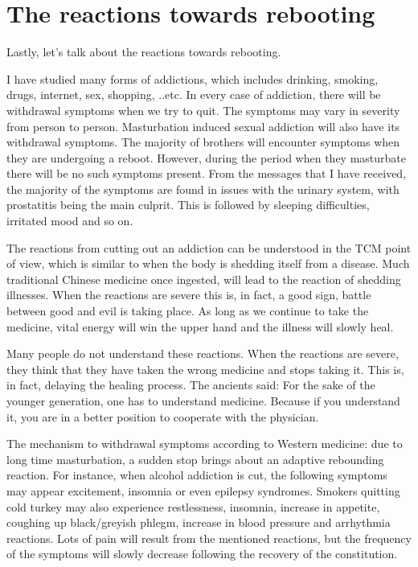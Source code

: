\documentclass[
]{book}
\begin{document}
\hypertarget{the-reactions-towards-rebooting}{%
\section{The reactions towards rebooting}\label{the-reactions-towards-rebooting}}

Lastly, let's talk about the reactions towards rebooting.

I have studied many forms of addictions, which includes drinking, smoking, drugs, internet, sex, shopping, ..etc. In every case of addiction, there will be withdrawal symptoms when we try to quit. The symptoms may vary in severity from person to person. Masturbation induced sexual addiction will also have its withdrawal symptoms. The majority of brothers will encounter symptoms when they are undergoing a reboot. However, during the period when they masturbate there will be no such symptoms present. From the messages that I have received, the majority of the symptoms are found in issues with the urinary system, with prostatitis being the main culprit. This is followed by sleeping difficulties, irritated mood and so on.

The reactions from cutting out an addiction can be understood in the TCM point of view, which is similar to when the body is shedding itself from a disease. Much traditional Chinese medicine once ingested, will lead to the reaction of shedding illnesses. When the reactions are severe this is, in fact, a good sign, battle between good and evil is taking place. As long as we continue to take the medicine, vital energy will win the upper hand and the illness will slowly heal.

Many people do not understand these reactions. When the reactions are severe, they think that they have taken the wrong medicine and stops taking it. This is, in fact, delaying the healing process. The ancients said: For the sake of the younger generation, one has to understand medicine. Because if you understand it, you are in a better position to cooperate with the physician.

The mechanism to withdrawal symptoms according to Western medicine: due to long time masturbation, a sudden stop brings about an adaptive rebounding reaction. For instance, when alcohol addiction is cut, the following symptoms may appear excitement, insomnia or even epilepsy syndromes. Smokers quitting cold turkey may also experience restlessness, insomnia, increase in appetite, coughing up black/greyish phlegm, increase in blood pressure and arrhythmia reactions. Lots of pain will result from the mentioned reactions, but the frequency of the symptoms will slowly decrease following the recovery of the constitution.
\end{document}

